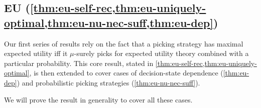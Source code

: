 \documentclass[a4paper]{article}
\newtheorem{theorem}{Theorem}
\newcommand\A{\mathcal{A}}
\newcommand\Exp{\mathsf{Exp}}
\newcommand\EU{\mathrm{EU}}
\newcommand\U{\mathfrak{U}} %
\newcommand{\D}{\mathcal{D}}
\newcommand{\n}{\mathsf{n}}
\renewcommand{\nu}{\n}
\DeclarePairedDelimiter\abs{\lvert}{\rvert}%
\newcommand*\diff{\mathop{}\!\mathrm{d}}
\renewcommand{\leq}{\leqslant}
\renewcommand{\geq}{\geqslant}
\newenvironment{CCM rewritten}
{\begingroup\color{blue}} %
{\endgroup}              %
\begin{document}
	
\subsection{EU (\cref{thm:eu-self-rec,thm:eu-uniquely-optimal,thm:eu-nu-nec-suff,thm:eu-dep})}\label{sect:EU-appendix}
Our first series of results rely on the fact that a picking strategy has maximal expected utility iff it $\mu$-surely picks for expected utility theory combined with a particular probability. This core result, stated in \cref{thm:eu-self-rec,thm:eu-uniquely-optimal}, is then extended to cover cases of decision-state dependence (\cref{thm:eu-dep}) and probabilistic picking strategies (\cref{thm:eu-nu-nec-suff}). 

We will prove the result in generality to cover all these cases. 

%
%	
%	
%
%
\end{document}

